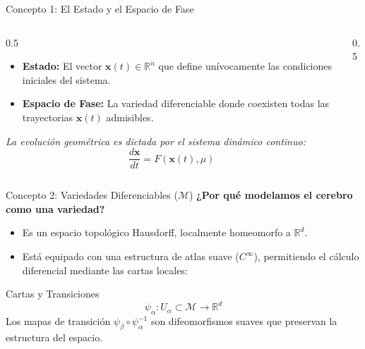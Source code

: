 \documentclass[10pt, aspectratio=169]{beamer} %
\begin{document}
\begin{frame}{Concepto 1: El Estado y el Espacio de Fase}
    \begin{columns}
        \begin{column}{0.5\textwidth}
            \begin{itemize}
                \item \textbf{Estado:} El vector $\mathbf{x}(t) \in \mathbb{R}^n$ que define unívocamente las condiciones iniciales del sistema.
                \item \textbf{Espacio de Fase:} La variedad diferenciable donde coexisten todas las trayectorias $\mathbf{x}(t)$ admisibles.
            \end{itemize}
            \vspace{0.5cm}
            \textit{La evolución geométrica es dictada por el sistema dinámico continuo:}
            \begin{equation*}
                \frac{d\mathbf{x}}{dt} = F(\mathbf{x}(t), \mu)
            \end{equation*}
        \end{column}
        \begin{column}{0.5\textwidth}
            \centering
        \end{column}
    \end{columns}
\end{frame}

\begin{frame}{Concepto 2: Variedades Diferenciables ($\mathcal{M}$)}
    \textbf{¿Por qué modelamos el cerebro como una variedad?}
    \vspace{0.3cm}
    \begin{itemize}
        \item Es un espacio topológico Hausdorff, \alert{localmente homeomorfo} a $\mathbb{R}^d$.
        \item Está equipado con una estructura de atlas suave ($C^\infty$), permitiendo el cálculo diferencial mediante las cartas locales:
    \end{itemize}
    \begin{block}{Cartas y Transiciones}
        \begin{equation*}
            \psi_\alpha: U_\alpha \subset \mathcal{M} \to \mathbb{R}^d
        \end{equation*}
        \centering \small Los mapas de transición $\psi_\beta \circ \psi_\alpha^{-1}$ son difeomorfismos suaves que preservan la estructura del espacio.
    \end{block}
\end{frame}
\end{document}
